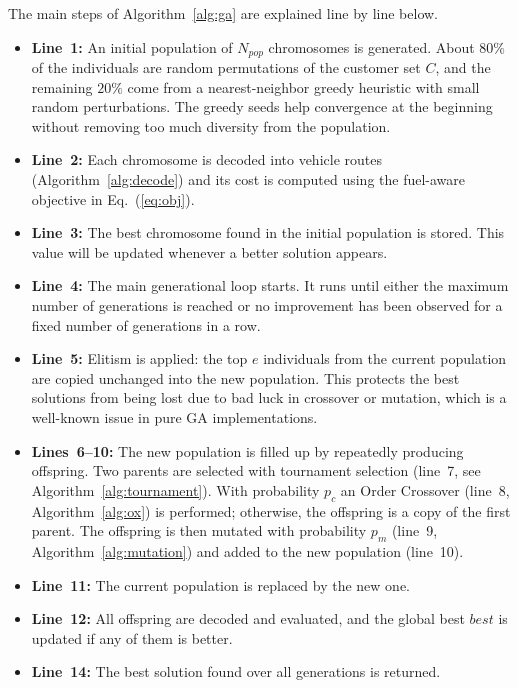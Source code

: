 \documentclass [a4paper, 11pt, titlepage] {article}
\begin{document}
The main steps of Algorithm~\ref{alg:ga} are explained line by line below.

\begin{itemize}
    \item \textbf{Line~1:} An initial population of $N_{pop}$ chromosomes is generated. About $80\%$ of the individuals are random permutations of the customer set $C$, and the remaining $20\%$ come from a nearest-neighbor greedy heuristic with small random perturbations. The greedy seeds help convergence at the beginning without removing too much diversity from the population.
    \item \textbf{Line~2:} Each chromosome is decoded into vehicle routes (Algorithm~\ref{alg:decode}) and its cost is computed using the fuel-aware objective in Eq.~(\ref{eq:obj}).
    \item \textbf{Line~3:} The best chromosome found in the initial population is stored. This value will be updated whenever a better solution appears.
    \item \textbf{Line~4:} The main generational loop starts. It runs until either the maximum number of generations is reached or no improvement has been observed for a fixed number of generations in a row.
    \item \textbf{Line~5:} Elitism is applied: the top $e$ individuals from the current population are copied unchanged into the new population. This protects the best solutions from being lost due to bad luck in crossover or mutation, which is a well-known issue in pure GA implementations.
    \item \textbf{Lines~6--10:} The new population is filled up by repeatedly producing offspring. Two parents are selected with tournament selection (line~7, see Algorithm~\ref{alg:tournament}). With probability $p_c$ an Order Crossover (line~8, Algorithm~\ref{alg:ox}) is performed; otherwise, the offspring is a copy of the first parent. The offspring is then mutated with probability $p_m$ (line~9, Algorithm~\ref{alg:mutation}) and added to the new population (line~10).
    \item \textbf{Line~11:} The current population is replaced by the new one.
    \item \textbf{Line~12:} All offspring are decoded and evaluated, and the global best $best$ is updated if any of them is better.
    \item \textbf{Line~14:} The best solution found over all generations is returned.
\end{itemize}
\end{document}
